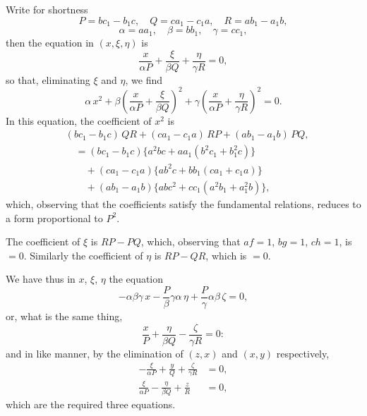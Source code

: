 \documentclass[11pt,a4paper]{book}
\begin{document}
Write for shortness
\[
P = bc_1 - b_1c,\quad Q = ca_1 - c_1a,\quad R = ab_1 - a_1b,
\]
\[
\alpha = aa_1,\quad \beta = bb_1,\quad \gamma = cc_1,
\]
then the equation in $(x,\xi,\eta)$ is
\[
\frac{x}{\alpha P} + \frac{\xi}{\beta Q} + \frac{\eta}{\gamma R} = 0,
\]
so that, eliminating $\xi$ and $\eta$, we find
\[
\alpha\,x^2 + \beta\left(\frac{x}{\alpha P} + \frac{\xi}{\beta Q}\right)^2 + \gamma\left(\frac{x}{\alpha P} + \frac{\eta}{\gamma R}\right)^2 = 0.
\]
In this equation, the coefficient of $x^2$ is
\begin{align*}
&(bc_1-b_1c)\,QR + (ca_1-c_1a)\,RP + (ab_1-a_1b)\,PQ,\\
&\quad = (bc_1-b_1c)\{a^2bc + aa_1(b^2c_1+b_1^2c)\} \\
&\quad\quad + (ca_1-c_1a)\{ab^2c + bb_1(ca_1+c_1a)\} \\
&\quad\quad + (ab_1-a_1b)\{abc^2 + cc_1(a^2b_1+a_1^2b)\},
\end{align*}
which, observing that the coefficients satisfy the fundamental relations, reduces to a form proportional to $P^2$.

The coefficient of $\xi$ is $RP - PQ$, which, observing that $af=1$, $bg=1$, $ch=1$, is $=0$. Similarly the coefficient of $\eta$ is $RP - QR$, which is $=0$.

We have thus in $x$, $\xi$, $\eta$ the equation
\[
-\alpha\beta\gamma\,x - \frac{P}{\beta}\gamma\alpha\,\eta + \frac{P}{\gamma}\alpha\beta\,\zeta = 0,
\]
or, what is the same thing,
\[
\frac{x}{P} + \frac{\eta}{\beta Q} - \frac{\zeta}{\gamma R} = 0:
\]
and in like manner, by the elimination of $(z,x)$ and $(x,y)$ respectively,
\begin{align*}
-\frac{\xi}{\alpha P} + \frac{y}{Q} + \frac{\zeta}{\gamma R} &= 0,\\
\frac{\xi}{\alpha P} - \frac{\eta}{\beta Q} + \frac{z}{R} &= 0,
\end{align*}
which are the required three equations.
\end{document}
